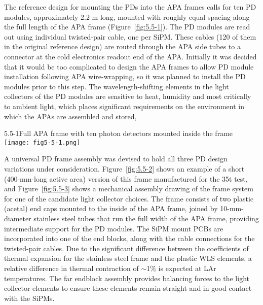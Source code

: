 The reference design for mounting the PDs into the APA frames calls for
ten PD modules, approximately 2.2 m long, mounted with roughly equal
spacing along the full length of the APA frame (Figure~\ref{fig:5.5-1}).  The
PD modules are read out using individual twisted-pair cable, one per
SiPM.  These cables (120 of them in the original reference design) are
routed through the APA side tubes to a connector at the cold
electronics readout end of the APA.  Initially it was decided that it
would be too complicated to design the APA frames to allow PD module
installation following APA wire-wrapping, so it was planned to install 
the PD modules %
prior to this step.%
The
wavelength-shifting elements in the light collectors of the PD modules
are sensitive to heat, humidity and most critically to %
ambient light, which places significant requirements  on the
environment in which the APAs are assembled and stored,%

\begin{cdrfigure}{5.5-1}{Full APA frame with ten photon detectors mounted
  inside the frame}
   \texttt{[image: fig5-5-1.png]}
\end{cdrfigure}

A universal PD frame assembly was devised to hold all three PD design
variations under consideration.  Figure~\ref{fig:5.5-2} shows an example of a
short (400-mm-long active area) version of this frame manufactured for
the 35t test,  and Figure~\ref{fig:5.5-3} shows a mechanical assembly drawing of
the frame system for one of the candidate light collector choices.
The frame consists of two plastic (acetal) end caps mounted to the
inside of the APA frame, joined by 10-mm-diameter stainless steel tubes
that run the full width of the APA frame, providing intermediate
support for the PD modules.%
The SiPM mount PCBs  are
incorporated into one of the end blocks, along with the cable
connections for the twisted-pair cables.  Due to the significant
difference between the coefficients of thermal expansion for the stainless
steel frame and the plastic WLS elements, %
a relative
difference in thermal contraction of $\sim$1\% is expected at LAr temperatures.  The
far endblock assembly provides balancing forces to the light collector
elements %
to ensure these elements remain %
straight and
in good contact with the SiPMs.

